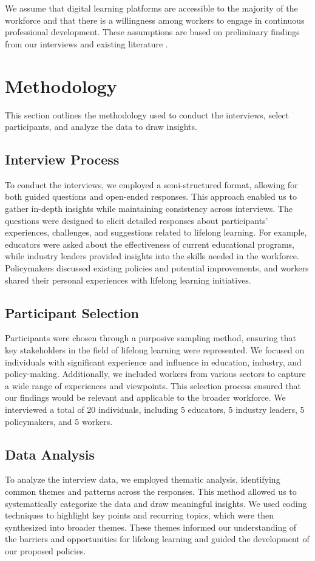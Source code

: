 \documentclass{article} %
\begin{document}
We assume that digital learning platforms are accessible to the majority of the workforce and that there is a willingness among workers to engage in continuous professional development. These assumptions are based on preliminary findings from our interviews and existing literature \citep{poledna2023economic}.

\section{Methodology}
\label{sec:method}

This section outlines the methodology used to conduct the interviews, select participants, and analyze the data to draw insights.

\subsection{Interview Process}
To conduct the interviews, we employed a semi-structured format, allowing for both guided questions and open-ended responses. This approach enabled us to gather in-depth insights while maintaining consistency across interviews. The questions were designed to elicit detailed responses about participants' experiences, challenges, and suggestions related to lifelong learning. For example, educators were asked about the effectiveness of current educational programs, while industry leaders provided insights into the skills needed in the workforce. Policymakers discussed existing policies and potential improvements, and workers shared their personal experiences with lifelong learning initiatives.

\subsection{Participant Selection}
Participants were chosen through a purposive sampling method, ensuring that key stakeholders in the field of lifelong learning were represented. We focused on individuals with significant experience and influence in education, industry, and policy-making. Additionally, we included workers from various sectors to capture a wide range of experiences and viewpoints. This selection process ensured that our findings would be relevant and applicable to the broader workforce. We interviewed a total of 20 individuals, including 5 educators, 5 industry leaders, 5 policymakers, and 5 workers.

\subsection{Data Analysis}
To analyze the interview data, we employed thematic analysis, identifying common themes and patterns across the responses. This method allowed us to systematically categorize the data and draw meaningful insights. We used coding techniques to highlight key points and recurring topics, which were then synthesized into broader themes. These themes informed our understanding of the barriers and opportunities for lifelong learning and guided the development of our proposed policies.
\end{document}
